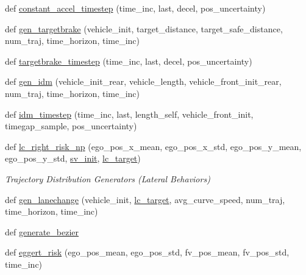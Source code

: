 \begin{DoxyCompactItemize}
def \hyperlink{namespaceimplementation_1_1sinadra__numpy_a091b3594c1bb34670cad99da45f69bb3}{constant\+\_\+accel\+\_\+timestep} (time\+\_\+inc, last, decel, pos\+\_\+uncertainty)
\item 
def \hyperlink{namespaceimplementation_1_1sinadra__numpy_a1938fc389773760eebb246250ded1b83}{gen\+\_\+targetbrake} (vehicle\+\_\+init, target\+\_\+distance, target\+\_\+safe\+\_\+distance, num\+\_\+traj, time\+\_\+horizon, time\+\_\+inc)
\item 
def \hyperlink{namespaceimplementation_1_1sinadra__numpy_ab1d01df58fb7fcf290059a4e1d3553f3}{targetbrake\+\_\+timestep} (time\+\_\+inc, last, decel, pos\+\_\+uncertainty)
\item 
def \hyperlink{namespaceimplementation_1_1sinadra__numpy_acc612c3cc09bb3f7dd6a1646e6481246}{gen\+\_\+idm} (vehicle\+\_\+init\+\_\+rear, vehicle\+\_\+length, vehicle\+\_\+front\+\_\+init\+\_\+rear, num\+\_\+traj, time\+\_\+horizon, time\+\_\+inc)
\item 
def \hyperlink{namespaceimplementation_1_1sinadra__numpy_ad5a4ac03b8d79ce978157dbb233c4116}{idm\+\_\+timestep} (time\+\_\+inc, last, length\+\_\+self, vehicle\+\_\+front\+\_\+init, timegap\+\_\+sample, pos\+\_\+uncertainty)
\item 
def \hyperlink{namespaceimplementation_1_1sinadra__numpy_adaff4dd4e07da3b80ec677586290a7e3}{lc\+\_\+right\+\_\+risk\+\_\+np} (ego\+\_\+pos\+\_\+x\+\_\+mean, ego\+\_\+pos\+\_\+x\+\_\+std, ego\+\_\+pos\+\_\+y\+\_\+mean, ego\+\_\+pos\+\_\+y\+\_\+std, \hyperlink{namespaceimplementation_1_1sinadra__numpy_af46bc79a7d30743826bc7ea2614ed60e}{sv\+\_\+init}, \hyperlink{namespaceimplementation_1_1sinadra__numpy_aa864273e93960c9fea1b39fd0b5d9d5d}{lc\+\_\+target})
\begin{DoxyCompactList}\small\item\em Trajectory Distribution Generators (Lateral Behaviors) \end{DoxyCompactList}\item 
def \hyperlink{namespaceimplementation_1_1sinadra__numpy_a4b7cbd2d26084cd3277008980f653f56}{gen\+\_\+lanechange} (vehicle\+\_\+init, \hyperlink{namespaceimplementation_1_1sinadra__numpy_aa864273e93960c9fea1b39fd0b5d9d5d}{lc\+\_\+target}, avg\+\_\+curve\+\_\+speed, num\+\_\+traj, time\+\_\+horizon, time\+\_\+inc)
\item 
def \hyperlink{namespaceimplementation_1_1sinadra__numpy_a6340d89002f5f933015712e232c5516b}{generate\+\_\+bezier}
\item 
def \hyperlink{namespaceimplementation_1_1sinadra__numpy_a1b621325a54fc077f500c4fb8becb427}{eggert\+\_\+risk} (ego\+\_\+pos\+\_\+mean, ego\+\_\+pos\+\_\+std, fv\+\_\+pos\+\_\+mean, fv\+\_\+pos\+\_\+std, time\+\_\+inc)

\end{DoxyCompactItemize}
